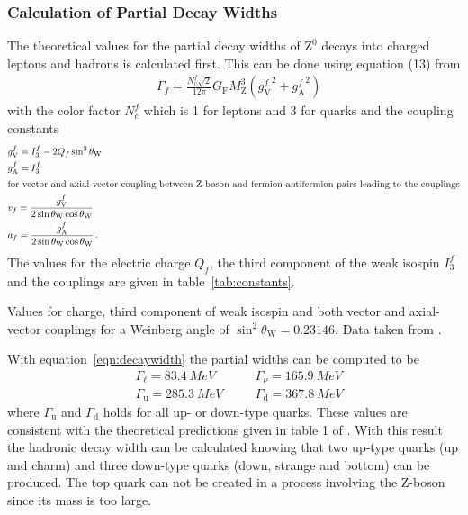 \documentclass[11pt, a4paper]{article}
\numberwithin{equation}{section}
\begin{document}
\subsubsection{Calculation of Partial Decay Widths}
\label{sec:calc_partial_width}
The theoretical values for the partial decay widths of $\mathrm{Z}^0$ decays into charged leptons and hadrons is calculated first.
This can be done using equation (13) from \cite{instructions}
\begin{align}
	&\Gamma_f = \frac{N_\mathrm{c}^f \sqrt{2}}{12 \pi} G_\mathrm{F} M_\mathrm{Z}^3 \left( {g_\mathrm{V}^f}^2 + {g_\mathrm{A}^f}^2 \right)
	\label{eqn:decaywidth}
\end{align}
with the color factor $N_c^f$ which is 1 for leptons and 3 for quarks and the coupling constants
\begin{align*}
	&g_\mathrm{V}^f = I_3^f - 2 Q_f \sin^2\theta_\mathrm{W}\\
	&g_\mathrm{A}^f = I_3^f \\
	\intertext{for vector and axial-vector coupling between Z-boson and fermion-antifermion pairs leading to the couplings}
	&v_f = \frac{g_\mathrm{V}^f}{2\sin\theta_\mathrm{W}\cos\theta_\mathrm{W}}\\
	&a_f = \frac{g_\mathrm{A}^f}{2\sin\theta_\mathrm{W}\cos\theta_\mathrm{W}} \,\text{.}
\end{align*}
The values for the electric charge $Q_f$, the third component of the weak isospin $I_3^f$ and the couplings are given in table~\ref{tab:constants}.
\begin{table}[h]
	\centering
	
	\caption{Values for charge, third component of weak isospin and both vector and axial-vector couplings for a Weinberg angle of $\sin^2\theta_\mathrm{W}=\num{0.23146}$. Data taken from \cite{thomson}.}
	\label{tab:constants}
\end{table}
With equation~\eqref{eqn:decaywidth} the partial widths can be computed to be
\begin{align*}
	&\Gamma_\ell = \SI{83.4}{MeV} \quad	&&\Gamma_\nu = \SI{165.9}{MeV} \\
	&\Gamma_\mathrm{u} = \SI{285.3}{MeV} \quad &&\Gamma_\mathrm{d} = \SI{367.8}{MeV}
\end{align*}
where $\Gamma_\mathrm{u}$ and $\Gamma_\mathrm{d}$ holds for all up- or down-type quarks.
These values are consistent with the theoretical predictions given in table 1 of \cite{instructions}.
With this result the hadronic decay width can be calculated knowing that two up-type quarks (up and charm) and three down-type quarks (down, strange and bottom) can be produced. The top quark can not be created in a process involving the Z-boson since its mass is too large.
\end{document}
